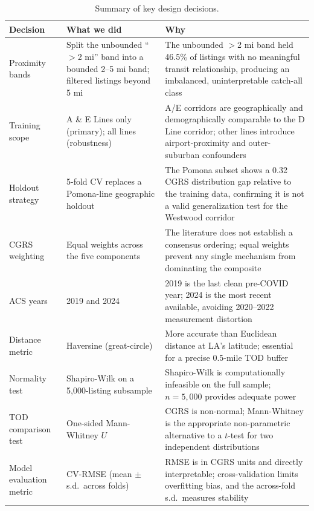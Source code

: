 \documentclass[11pt]{article}
\begin{document}
\begin{table}[ht]
\centering
\caption{Summary of key design decisions.}
\label{tab:decisions}
\small
\begin{tabular}{p{} p{} p{}}
\toprule
\rowcolor{tableheader}
\textbf{Decision} & \textbf{What we did} & \textbf{Why} \\
\midrule
Proximity bands & Split the unbounded ``$>$2 mi'' band into a bounded 2--5 mi band; filtered listings beyond 5 mi & The unbounded $>$2 mi band held 46.5\% of listings with no meaningful transit relationship, producing an imbalanced, uninterpretable catch-all class \\
Training scope & A \& E Lines only (primary); all lines (robustness) & A/E corridors are geographically and demographically comparable to the D Line corridor; other lines introduce airport-proximity and outer-suburban confounders \\
Holdout strategy & 5-fold CV replaces a Pomona-line geographic holdout & The Pomona subset shows a 0.32 CGRS distribution gap relative to the training data, confirming it is not a valid generalization test for the Westwood corridor \\
CGRS weighting & Equal weights across the five components & The literature does not establish a consensus ordering; equal weights prevent any single mechanism from dominating the composite \\
ACS years & 2019 and 2024 & 2019 is the last clean pre-COVID year; 2024 is the most recent available, avoiding 2020--2022 measurement distortion \\
Distance metric & Haversine (great-circle) & More accurate than Euclidean distance at LA's latitude; essential for a precise 0.5-mile TOD buffer \\
Normality test & Shapiro-Wilk on a 5,000-listing subsample & Shapiro-Wilk is computationally infeasible on the full sample; $n=5{,}000$ provides adequate power \\
TOD comparison test & One-sided Mann-Whitney $U$ & CGRS is non-normal; Mann-Whitney is the appropriate non-parametric alternative to a $t$-test for two independent distributions \\
Model evaluation metric & CV-RMSE (mean $\pm$ s.d.\ across folds) & RMSE is in CGRS units and directly interpretable; cross-validation limits overfitting bias, and the across-fold s.d.\ measures stability \\
\bottomrule
\end{tabular}
\end{table}
\end{document}
